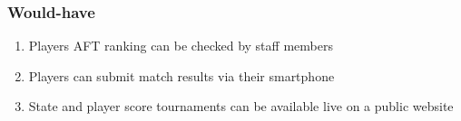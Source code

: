 \subsubsection{Would-have}

\begin{enumerate}
    \item Players AFT ranking can be checked by staff members
    \item Players can submit match results via their smartphone
    \item State and player score tournaments can be available live on a
        public website
\end{enumerate}


